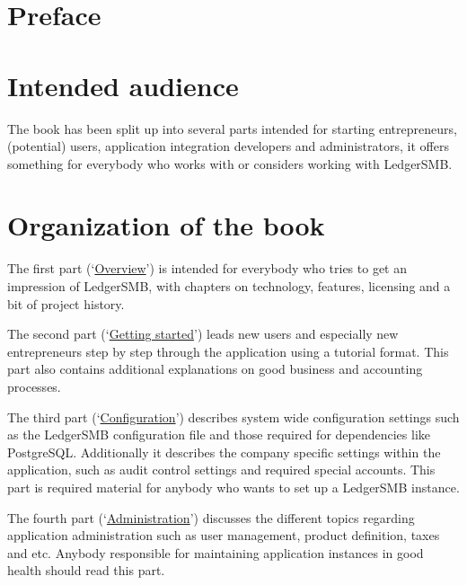 \documentclass[10pt,a4paper]{book}
\begin{document}
\tableofcontents

\listoffigures

\listoftables

\printglossaries

\cleardoublepage

\section*{Preface}
\label{preface}

\section*{Intended audience}
\label{sec-intended-audience}

The book has been split up into several parts intended for starting entrepreneurs,
(potential) users, application integration developers and
administrators, it offers something for everybody who works with or considers working with
LedgerSMB.

\section*{Organization of the book}
\label{sec-book-organization}

The first
part (\lq\hyperref[part-overview]{Overview}\rq) is intended for everybody who tries to get an impression of LedgerSMB, with
chapters on technology, features, licensing and a bit of project history.

The second part
(\lq\hyperref[part-getting-started]{Getting started}\rq) leads new users and especially new entrepreneurs step by step through the
application using a tutorial format. This part also contains additional explanations on good business and accounting
processes.

The third part (\lq\hyperref[part-configuration]{Configuration}\rq) describes system wide configuration settings such as
the LedgerSMB configuration file and those required for dependencies like PostgreSQL. Additionally
it describes the company specific settings within the application, such as audit control settings
and required special accounts. This part is required material for anybody who wants to set up
a LedgerSMB instance.

The fourth part (\lq\hyperref[part-administration]{Administration}\rq) discusses the different topics
regarding application administration such as user management, product definition, taxes and etc.
Anybody responsible for maintaining application instances in good health should read this part.
\end{document}
